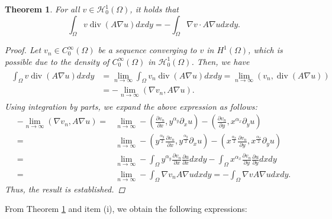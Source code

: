 \documentclass[9pt,reqno]{amsart}
\newtheorem{theorem}{Theorem}
\theoremstyle{plain}
\numberwithin{equation}{section}
\numberwithin{theorem}{section}
\def\Om{\Omega}
\DeclareMathOperator*{\Div}{\mathrm{div}}
\def\Om{\Omega}
\begin{document}
	\begin{theorem}\label{DIV}
		For all $v\in \mathcal{H}_0^1(\Omega)$, it holds that
		\begin{equation*}
			\int_\Om v \Div(A\nabla u) dx dy= -\int_\Om \nabla v \cdot A\nabla u dx dy. 
		\end{equation*}
		\begin{proof}
			Let $v_n \in C_0^\infty(\Omega)$ be a sequence converging to $v$ in $H^1(\Omega)$, which is possible due to the density of $C_0^\infty(\Omega)$ in $\mathcal{H}_0^1(\Omega)$. Then, we have
			\begin{align*}
				\begin{split}
					\int_\Om v \Div(A\nabla u) dx dy
					&= \lim\limits_{n\to \infty} \int_\Om v_n \Div(A\nabla u) dx dy=\lim\limits_{n\to \infty}\left(  v_n,\Div(A\nabla u)\right)\\  &=-\lim\limits_{n\to \infty}\left( \nabla v_n, A\nabla u\right).
				\end{split}
			\end{align*}
			Using integration by parts, we expand the above expression as follows:
			\begin{equation*}
				\begin{split}
					-\lim\limits_{n\to \infty}\left( \nabla v_n, A\nabla u\right)=&\lim\limits_{n\to \infty}-\left( \frac{\partial v_n}{\partial x}, y^{\alpha_y}\partial_x u\right)-\left( \frac{\partial v_n}{\partial y}, x^{\alpha_x}\partial_y u\right)\\
					=&\lim\limits_{n\to \infty}-\left(y^{\frac{\alpha_y}{2}} \frac{\partial v_n}{\partial x}, y^{\frac{\alpha_y}{2}}\partial_x u\right)-\left(x^{\frac{\alpha_x}{2}} \frac{\partial v_n}{\partial y}, x^{\frac{\alpha_x}{2}}\partial_y u\right)\\
					=&\lim\limits_{n\to \infty}-\int_{\Om} y^{\alpha_y}\frac{\partial v_n}{\partial x}\frac{\partial u}{\partial x} dx dy - \int_{\Om} x^{\alpha_x}\frac{\partial v_n}{\partial y}\frac{\partial u}{\partial y} dx dy\\
					=&\lim\limits_{n\to \infty}-\int_{\Om} \nabla v_n A \nabla u dx dy =-\int_{\Om} \nabla v A \nabla u dx dy.
				\end{split}
			\end{equation*}
			Thus, the result is established.
		\end{proof}
	\end{theorem}
	From Theorem \ref{DIV} and item (i), we obtain the following expressions:
\end{document}
